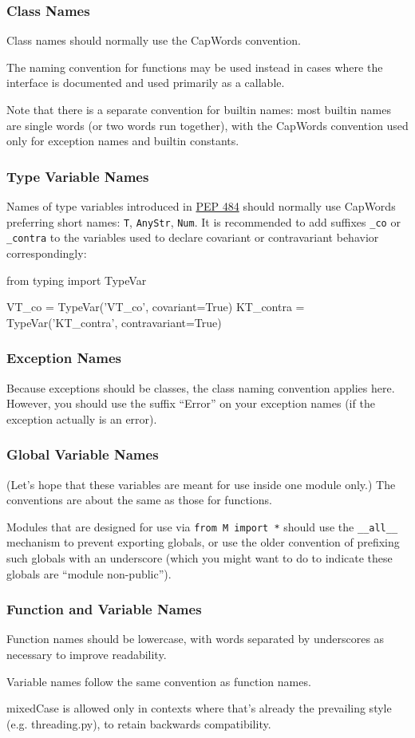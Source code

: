 \documentclass[a4paper,11pt]{article}
\begin{document}
\subsubsection{Class Names}
Class names should normally use the CapWords convention.
\par
The naming convention for functions may be used instead in cases where the 
interface is documented and used primarily as a callable.
\par
Note that there is a separate convention for builtin names: most builtin 
names are single words (or two words run together), with the CapWords 
convention used only for exception names and builtin constants.
\subsubsection{Type Variable Names}
Names of type variables introduced in 
\href{https://peps.python.org/pep-0484/}{PEP 484} should normally use 
CapWords preferring short names: \verb"T", \verb"AnyStr", \verb"Num". It is 
recommended to add suffixes \verb"_co" or \verb"_contra" to the variables 
used to declare covariant or contravariant behavior correspondingly:
\begin{python}
from typing import TypeVar

VT_co = TypeVar('VT_co', covariant=True)
KT_contra = TypeVar('KT_contra', contravariant=True)
\end{python}
\subsubsection{Exception Names}
Because exceptions should be classes, the class naming convention applies 
here. However, you should use the suffix “Error” on your exception names (if 
the exception actually is an error).
\subsubsection{Global Variable Names}
(Let’s hope that these variables are meant for use inside one module only.) 
The conventions are about the same as those for functions.
\par
Modules that are designed for use via \verb"from M import *" should use the 
\verb"__all__" mechanism to prevent exporting globals, or use the older 
convention of prefixing such globals with an underscore (which you might want 
to do to indicate these globals are “module non-public”).
\subsubsection{Function and Variable Names}
Function names should be lowercase, with words separated by underscores as 
necessary to improve readability.
\par
Variable names follow the same convention as function names.
\par
mixedCase is allowed only in contexts where that’s already the prevailing 
style (e.g. threading.py), to retain backwards compatibility.
\end{document}
